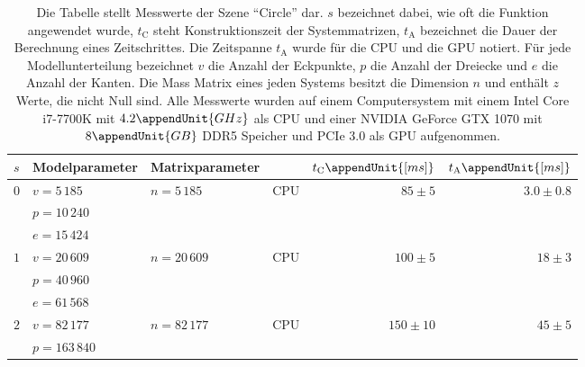 \documentclass{article}
\begin{document}
    \begin{table}[h]
      \renewcommand{\arraystretch}{1.3}
      \footnotesize
      \center
      \caption{%
        Die Tabelle stellt Messwerte der Szene \enquote{Circle} dar.
        $s$ bezeichnet dabei, wie oft die Funktion  angewendet wurde, $t_\mathrm{C}$ steht Konstruktionszeit der Systemmatrizen, $t_\mathrm{A}$ bezeichnet die Dauer der Berechnung eines Zeitschrittes.
        Die Zeitspanne $t_\mathrm{A}$ wurde für die CPU und die GPU notiert.
        Für jede Modellunterteilung bezeichnet $v$ die Anzahl der Eckpunkte, $p$ die Anzahl der Dreiecke und $e$ die Anzahl der Kanten.
        Die Mass Matrix eines jeden Systems besitzt die Dimension $n$ und enthält $z$ Werte, die nicht Null sind.
        Alle Messwerte wurden auf einem Computersystem mit einem Intel Core i7-7700K mit $4.2\appendUnit{GHz}$ als CPU und einer NVIDIA GeForce GTX 1070 mit $8\appendUnit{GB}$ DDR5 Speicher und PCIe 3.0 als GPU aufgenommen.
      }
      \label{tab:results}
      \begin{tabular}{llllrr}
        \hline
        $s$ & Modelparameter & Matrixparameter & & $t_\mathrm{C}\appendUnit{[ms]}$ & $t_\mathrm{A}\appendUnit{[ms]}$ \\
        \hline
        \hline
        \multirow{3}{*}{$0$} & $v = 5\,185$ & \multirow{2}{*}{$n=5\,185$} & \multirow{2}{*}{CPU} & \multirow{2}{*}{$85\pm 5$} & \multirow{2}{*}{$3.0\pm 0.8$} \\
          & $p = 10\,240$ & \multirow{2}{*}{$z = 36\,033$} & \multirow{2}{*}{GPU} & \multirow{2}{*}{---} & \multirow{2}{*}{$2.35\pm 0.05$} \\
          & $e = 15\,424$ & & \\
        \hline
        \multirow{3}{*}{$1$} & $v = 20\,609$ & \multirow{2}{*}{$n=20\,609$} & \multirow{2}{*}{CPU} & \multirow{2}{*}{$100\pm 5$} & \multirow{2}{*}{$18\pm 3$} \\
          & $p = 40\,960$ & \multirow{2}{*}{$z = 143\,745$} & \multirow{2}{*}{GPU} & \multirow{2}{*}{---} & \multirow{2}{*}{$2.35\pm 0.05$} \\
          & $e = 61\,568$ & & \\
        \hline
        \multirow{3}{*}{$2$} & $v = 82\,177$ & \multirow{2}{*}{$n=82\,177$} & \multirow{2}{*}{CPU} & \multirow{2}{*}{$150\pm 10$} & \multirow{2}{*}{$45\pm 5$} \\
          & $p = 163\,840$ & \multirow{2}{*}{$z = 574\,209$} & \multirow{2}{*}{GPU} & \multirow{2}{*}{---} & \multirow{2}{*}{$2.20\pm 0.05$} \\

\end{tabular}
\end{table}
\end{document}
